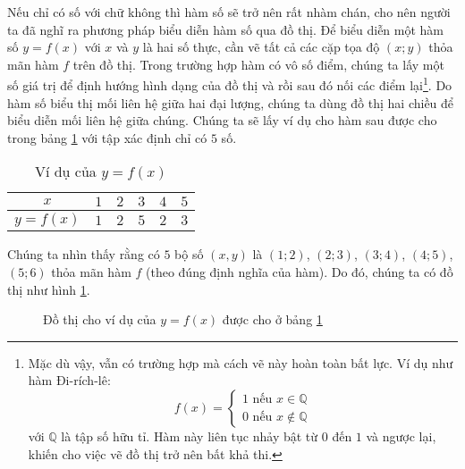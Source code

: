 Nếu chỉ có số với chữ không thì hàm số sẽ trở nên rất nhàm chán, cho nên người ta đã nghĩ ra phương pháp biểu diễn hàm số qua đồ thị. Để biểu diễn một hàm số $y=f(x)$ với $x$ và $y$ là hai số thực, cần vẽ tất cả các cặp tọa độ $(x; y)$ thỏa mãn hàm $f$ trên đồ thị. Trong trường hợp hàm có vô số điểm, chúng ta lấy một số giá trị để định hướng hình dạng của đồ thị và rồi sau đó nối các điểm lại\footnote{Mặc dù vậy, vẫn có trường hợp mà cách vẽ này hoàn toàn bất lực. Ví dụ như hàm Đi-rích-lê: $$f(x) =
\begin{cases}
   1 \text{ nếu } x\in \mathbb{Q} \\
   0 \text{ nếu } x\notin \mathbb{Q}
\end{cases}$$ với $\mathbb{Q}$ là tập số hữu tỉ. Hàm này liên tục nhảy bật từ $0$ đến $1$ và ngược lại, khiến cho việc vẽ đồ thị trở nên bất khả thi.}. Do hàm số biểu thị mối liên hệ giữa hai đại lượng, chúng ta dùng đồ thị hai chiều để biểu diễn mối liên hệ giữa chúng. Chúng ta sẽ lấy ví dụ cho hàm sau được cho trong bảng \ref{tab:ham_so_mot_bien:dinh_nghia:vddths} với tập xác định chỉ có $5$ số.

\begin{table}[h]
   \centering
   \begin{tabular}{|c|c|c|c|c|c|}
      \hline
      $x$ & $1$ & $2$ & $3$ & $4$ & $5$ \\
      \hline
      $y=f(x)$ & $1$ & $2$ & $5$ & $2$ & $3$ \\
      \hline
   \end{tabular}
   \caption{Ví dụ của $y = f(x)$}
   \label{tab:ham_so_mot_bien:dinh_nghia:vddths}
\end{table}

\noindent Chúng ta nhìn thấy rằng có $5$ bộ số $(x,y)$ là $(1;2)$, $(2;3)$, $(3;4)$, $(4;5)$, $(5;6)$ thỏa mãn hàm $f$ (theo đúng định nghĩa của hàm). Do đó, chúng ta có đồ thị như hình \ref{fig:ham_so_mot_bien:dinh_nghia:vddths}. 

\begin{figure}[h]
   \centering
   \caption{Đồ thị cho ví dụ của $y = f(x)$ được cho ở bảng \ref{tab:ham_so_mot_bien:dinh_nghia:vddths}}
   \label{fig:ham_so_mot_bien:dinh_nghia:vddths}
\end{figure}

